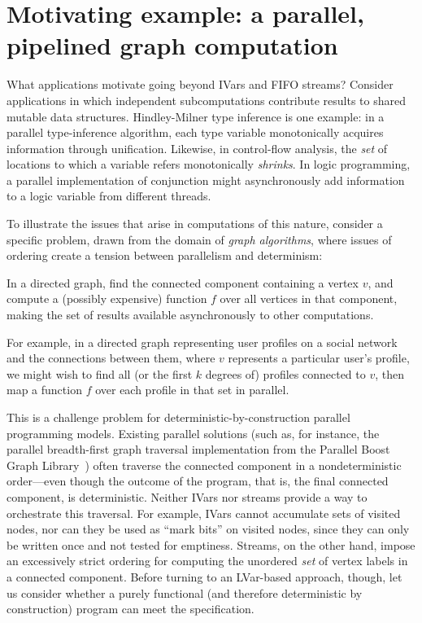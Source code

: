\section{Motivating example: a parallel, pipelined graph computation}\label{s:lvars-motivation}

What applications motivate going beyond IVars and FIFO streams?
Consider applications in which independent subcomputations contribute
results to shared mutable data structures.  
Hindley-Milner type inference is one example: in a
parallel type-inference algorithm, each type variable monotonically
acquires information through unification.
Likewise, in control-flow analysis, the \emph{set} of
locations to which a variable refers monotonically \emph{shrinks}.  In
logic programming, a parallel implementation of conjunction might
asynchronously add information to a logic variable from different
threads.

To illustrate the issues that arise in computations of this nature,
consider a specific problem, drawn from the domain of \emph{graph
  algorithms}, where issues of ordering create a tension between
parallelism and determinism:
\begin{blockquote}
  In a directed graph, find the connected component containing a
  vertex $v$, and compute a (possibly expensive) function $f$ over all
  vertices in that component, making the set of results available
  asynchronously to other computations.
\end{blockquote}
\noindent For example, in a directed graph representing user profiles on a
social network and the connections between them, where $v$ represents
a particular user's profile, we might wish to find all (or the first $k$
degrees of) profiles connected to $v$, then map a function $f$ over
each profile in that set in parallel.

This is a challenge problem for deterministic-by-construction parallel
programming models. Existing parallel solutions (such as, for instance, the
parallel breadth-first graph traversal implementation from the
Parallel Boost Graph Library~) often traverse the
connected component in a nondeterministic order---even though the
outcome of the program, that is, the final connected component, is
deterministic.  Neither IVars nor streams provide a way 
to orchestrate this traversal.  For
example, IVars cannot accumulate sets of visited nodes, nor can they
be used as ``mark bits'' on visited nodes, since they can only be
written once and not tested for emptiness.  Streams, on the other
hand, impose an excessively strict ordering for computing the
unordered \emph{set} of vertex labels in a connected component.
Before turning to an LVar-based approach, though, let us consider
whether a purely functional (and therefore deterministic by
construction) program can meet the specification.

